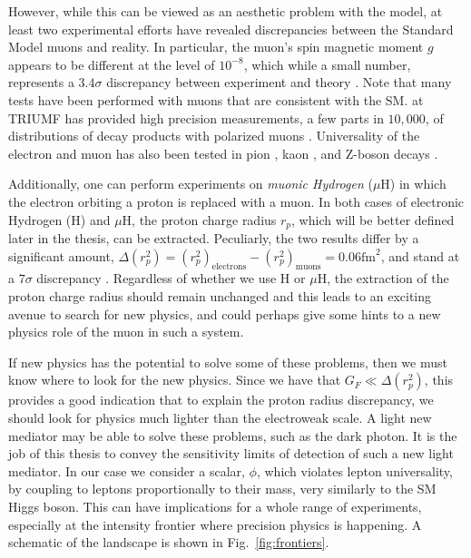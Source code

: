 However, while this can be viewed as an aesthetic problem with the model, at least two experimental efforts have revealed discrepancies between the Standard Model muons and reality.
In particular, the muon's spin magnetic moment $g$ appears to be different at the level of $10^{-8}$, which while a small number, represents a $3.4\sigma$ discrepancy between experiment and theory \cite{2007PhLB..649..173H}.
Note that many tests have been performed with muons that are consistent with the SM.
\twist at TRIUMF has provided high precision measurements, a few parts in $10,000$, of distributions of decay products with polarized muons \cite{Bayes:2011zza}.
Universality of the electron and muon has also been tested in pion \cite{Czapek:1993kc}, kaon \cite{Antonelli:2008jg}, and Z-boson decays \cite{Alexander:1991qw}.

Additionally, one can perform experiments on \emph{muonic Hydrogen} ($\mu\textrm{H}$) in which the electron orbiting a proton is replaced with a muon.
In both cases of electronic Hydrogen (H) and $\mu\textrm{H}$, the proton charge radius $r_p$, which will be better defined later in the thesis, can be extracted.
Peculiarly, the two results differ by a significant amount, $\Delta(r_p^2) = (r_p^2)_{\textrm{electrons}} - (r_p^2)_{\textrm{muons}} = 0.06\textrm{fm}^2$, and stand at a $7\sigma$ discrepancy \cite{Carlson:2015jba}.
Regardless of whether we use H or $\mu\textrm{H}$, the extraction of the proton charge radius should remain unchanged and this leads to an exciting avenue to search for new physics, and could perhaps give some hints to a new physics role of the muon in such a system.

If new physics has the potential to solve some of these problems, then we must know where to look for the new physics.
Since we have that $G_F \ll \Delta(r_p^2)$, this provides a good indication that to explain the proton radius discrepancy, we should look for physics much lighter than the electroweak scale.
A light new mediator may be able to solve these problems, such as the dark photon.
It is the job of this thesis to convey the sensitivity limits of detection of such a new light mediator.
In our case we consider a scalar, $\phi$, which violates lepton universality, by coupling to leptons proportionally to their mass, very similarly to the SM Higgs boson.
This can have implications for a whole range of experiments, especially at the intensity frontier where precision physics is happening.
A schematic of the landscape is shown in Fig.\ \ref{fig:frontiers}.

